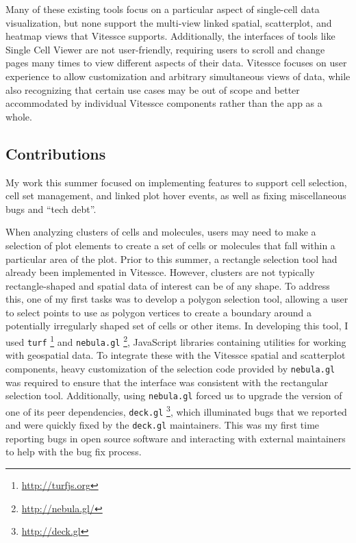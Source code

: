 \documentclass[12pt, letterpaper]{article}
\begin{document}
Many of these existing tools focus on a particular aspect of single-cell data visualization, but none support the multi-view linked spatial, scatterplot, and heatmap views that Vitessce supports.
Additionally, the interfaces of tools like Single Cell Viewer are not user-friendly, requiring users to scroll and change pages many times to view different aspects of their data.
Vitessce focuses on user experience to allow customization and arbitrary simultaneous views of data, while also recognizing that certain use cases may be out of scope and better accommodated by individual Vitessce components rather than the app as a whole.

\subsection{Contributions}
My work this summer focused on implementing features to support cell selection, cell set management, and linked plot hover events, as well as fixing miscellaneous bugs and ``tech debt''.

When analyzing clusters of cells and molecules, users may need to make a selection of plot elements to create a set of cells or molecules that fall within a particular area of the plot.
Prior to this summer, a rectangle selection tool had already been implemented in Vitessce.
However, clusters are not typically rectangle-shaped and spatial data of interest can be of any shape.
To address this, one of my first tasks was to develop a polygon selection tool, allowing a user to select points to use as polygon vertices to create a boundary around a potentially irregularly shaped set of cells or other items.
In developing this tool, I used \texttt{turf} \footnote{\url{http://turfjs.org}} and \texttt{nebula.gl} \footnote{\url{http://nebula.gl/}}, JavaScript libraries containing utilities for working with geospatial data.
To integrate these with the Vitessce spatial and scatterplot components, heavy customization of the selection code provided by \texttt{nebula.gl} was required to ensure that the interface was consistent with the rectangular selection tool.
Additionally, using \texttt{nebula.gl} forced us to upgrade the version of one of its peer dependencies, \texttt{deck.gl} \footnote{\url{http://deck.gl}}, which illuminated bugs that we reported and were quickly fixed by the \texttt{deck.gl} maintainers.
This was my first time reporting bugs in open source software and interacting with external maintainers to help with the bug fix process.
\end{document}
